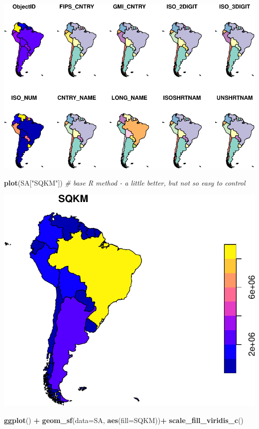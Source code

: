 \documentclass[]{article}
\newenvironment{Shaded}{\begin{snugshade}}{\end{snugshade}}
\newcommand{\CommentTok}[1]{\textcolor[rgb]{0.56,0.35,0.01}{\textit{#1}}}
\newcommand{\DataTypeTok}[1]{\textcolor[rgb]{0.13,0.29,0.53}{#1}}
\newcommand{\KeywordTok}[1]{\textcolor[rgb]{0.13,0.29,0.53}{\textbf{#1}}}
\newcommand{\NormalTok}[1]{#1}
\newcommand{\OperatorTok}[1]{\textcolor[rgb]{0.81,0.36,0.00}{\textbf{#1}}}
\newcommand{\StringTok}[1]{\textcolor[rgb]{0.31,0.60,0.02}{#1}}
\begin{document}
\includegraphics{R_tidyverse_for_geographers_files/figure-latex/unnamed-chunk-33-1.pdf}

\begin{Shaded}
\begin{Highlighting}[]
\KeywordTok{plot}\NormalTok{(SA[}\StringTok{"SQKM"}\NormalTok{]) }\CommentTok{# base R method - a little better, but not so easy to control}
\end{Highlighting}
\end{Shaded}

\includegraphics{R_tidyverse_for_geographers_files/figure-latex/unnamed-chunk-33-2.pdf}

\begin{Shaded}
\begin{Highlighting}[]
\KeywordTok{ggplot}\NormalTok{() }\OperatorTok{+}\StringTok{ }\KeywordTok{geom_sf}\NormalTok{(}\DataTypeTok{data=}\NormalTok{SA, }\KeywordTok{aes}\NormalTok{(}\DataTypeTok{fill=}\NormalTok{SQKM))}\OperatorTok{+}
\StringTok{  }\KeywordTok{scale_fill_viridis_c}\NormalTok{()}
\end{Highlighting}
\end{Shaded}
\end{document}
